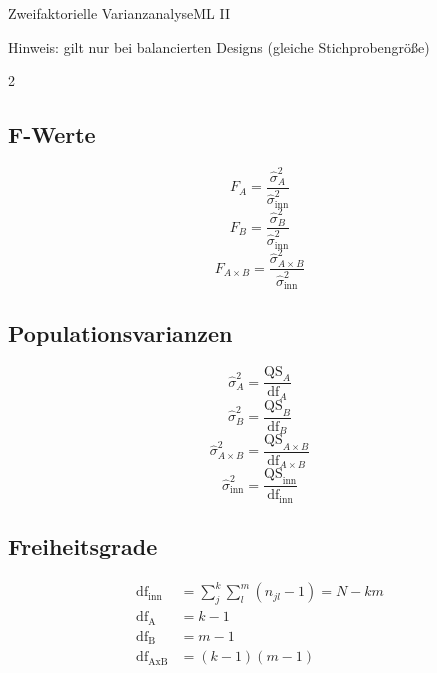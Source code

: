 \begin{formulaBox}{Zweifaktorielle Varianzanalyse}{ML II}
\begin{center}
 
Hinweis: gilt nur bei balancierten Designs (gleiche Stichprobengröße)
\end{center}

\begin{multicols}{2}
\subsection*{F-Werte} 
$$F_A=\frac{\hat{\sigma}_A^2}{\hat{\sigma}^2_{\mathrm{inn}}}$$ $$F_B=\frac{\hat{\sigma}_B^2}{\hat{\sigma}^2_{\mathrm{inn}}}$$ $$F_{A\times B}=\frac{\hat{\sigma}_{A\times B}^2}{\hat{\sigma}^2_{\mathrm{inn}}}$$

\subsection*{Populationsvarianzen}
$$\hat{\sigma}_A^2=\frac{\mathrm{QS}_{A}}{\mathrm{df}_{A}}$$ $$\hat{\sigma}_B^2=\frac{\mathrm{QS}_{B}}{\mathrm{df}_{B}}$$  $$\hat{\sigma}_{A\times B}^2=\frac{\mathrm{QS}_{A\times B}}{\mathrm{df}_{A\times B}}$$
$$\hat{\sigma}^2_ {\mathrm{inn}}=\frac{\mathrm{QS}_{\mathrm{inn}}}{\mathrm{df}_{\mathrm{inn}}}$$

\subsection*{Freiheitsgrade}
\begin{align*}
\mathrm{df}_{\mathrm{inn}}&=\sum\limits_j^k \sum\limits_l^m (n_{jl}-1) = N-km \\
\mathrm{df}_{\mathrm{A}}&=k-1\\
\mathrm{df}_{\mathrm{B}}&=m-1\\
\mathrm{df}_{\mathrm{AxB}}&=(k-1)(m-1)\\
\end{align*}


\end{multicols}
\end{formulaBox}
